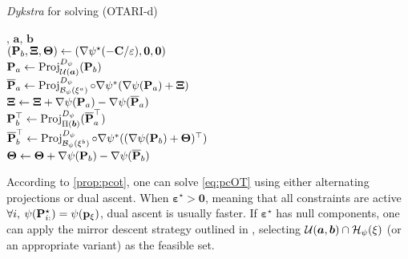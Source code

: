 \begin{algorithm}[H]
  \caption{\textit{Dykstra} for solving (OTARI-d)}
  \label{algo:Dykstra_pcot}
  \begin{algorithmic}[1]
      , $\bm{a}$, $\bm{b}$ \\
      \STATE $\left({\mathbf{P}}_b, \bm{\Xi}, \bm{\Theta} \right) \leftarrow \left(\nabla \psi^{\star}(-{\mathbf{C}} / \varepsilon), \mathbf{0}, \mathbf{0} \right)$ \\
          \STATE ${\mathbf{P}}_a \leftarrow \operatorname{Proj}^{D_\psi}_{{\mathcal{U}}(\bm{a})}({\mathbf{P}}_b)$ 
          \\
          \STATE $\overline{{\mathbf{P}}}_{a} \leftarrow \operatorname{Proj}^{D_\psi}_{\mathcal{B}_{\psi}(\xi^{a})}\circ \nabla \psi^*(\nabla \psi({\mathbf{P}}_a) + \bm{\Xi})$ 
          \\
          \STATE $\bm{\Xi} \leftarrow \bm{\Xi} + \nabla \psi({\mathbf{P}}_{a}) - \nabla \psi(\overline{{\mathbf{P}}}_{a})$
          \\
          \STATE ${\mathbf{P}}^\top_b \leftarrow \operatorname{Proj}^{D_\psi}_{\Pi(\bm{b})}(\overline{{\mathbf{P}}}_{a}^\top)$ 
          \\
          \STATE $\overline{{\mathbf{P}}}_{b}^\top \leftarrow \operatorname{Proj}^{D_\psi}_{\mathcal{B}_{\psi}(\xi^{b})}\circ \nabla \psi^*((\nabla \psi({\mathbf{P}}_b) + \bm{\Theta})^\top)$ 
          \\
          \STATE $\bm{\Theta} \leftarrow \bm{\Theta} + \nabla \psi({\mathbf{P}}_{b}) - \nabla \psi(\overline{{\mathbf{P}}}_{b})$
      \ENDWHILE  
\end{algorithmic}
\end{algorithm}

According to \cref{prop:pcot}, one can solve \eqref{eq:pcOT} using either alternating projections or dual ascent. 
When $\bm{\varepsilon}^\star \bm{>} \bm{0}$, meaning that all constraints are active \ie $\forall i, \: \psi({\mathbf{P}}^\star_{i:}) = \psi(\mathbf{p}_{\xi})$, dual ascent is usually faster. If $\bm{\varepsilon}^\star$ has null components, one can apply the mirror descent strategy outlined in , selecting ${\mathcal{U}}(\bm{a}, \bm{b}) \cap \mathcal{H}_\psi(\xi)$ (or an appropriate variant) as the feasible set.

